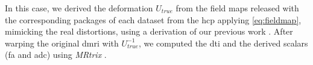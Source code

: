 In this case, we derived the deformation $U_{true}$ from the field maps released with
  the corresponding packages of each dataset from the \gls*{hcp} applying \eqref{eq:fieldmap},
  mimicking the real distortions, using a derivation of our previous work
  \citep{esteban_simulationbased_2014}.
After warping the original \gls*{dmri} with $U_{true}^{-1}$, we computed the \gls*{dti} and
  the derived scalars (\gls*{fa} and \gls*{adc}) using \emph{MRtrix} \citep{tournier_mrtrix_2012}.
